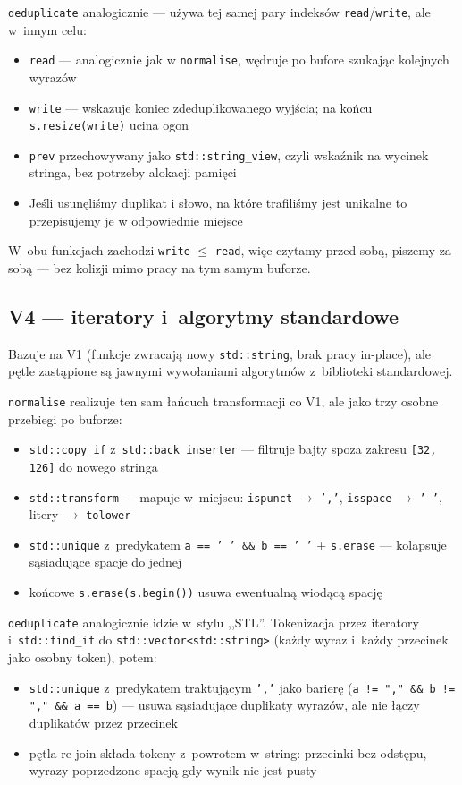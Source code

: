 \documentclass[11pt,a4paper]{article}
\begin{document}
\texttt{deduplicate} analogicznie --- używa tej samej pary indeksów \texttt{read}/\texttt{write}, ale w~innym celu:
\begin{itemize}
    \item \texttt{read} --- analogicznie jak w \texttt{normalise}, wędruje po bufore szukając kolejnych wyrazów
    \item \texttt{write} --- wskazuje koniec zdeduplikowanego wyjścia; na końcu \texttt{s.resize(write)} ucina ogon
    \item \texttt{prev} przechowywany jako \texttt{std::string\_view}, czyli wskaźnik na wycinek stringa, bez potrzeby alokacji pamięci
    \item Jeśli usunęliśmy duplikat i słowo, na które trafiliśmy jest unikalne to przepisujemy je w odpowiednie miejsce
\end{itemize}

W~obu funkcjach zachodzi \texttt{write} $\leq$ \texttt{read}, więc czytamy przed sobą, piszemy za sobą --- bez kolizji mimo pracy na tym samym buforze.

\subsection{V4 --- iteratory i~algorytmy standardowe}
Bazuje na V1 (funkcje zwracają nowy \texttt{std::string}, brak pracy in-place), ale pętle zastąpione są jawnymi wywołaniami algorytmów z~biblioteki standardowej.

\texttt{normalise} realizuje ten sam łańcuch transformacji co V1, ale jako trzy osobne przebiegi po buforze:
\begin{itemize}
    \item \texttt{std::copy\_if} z~\texttt{std::back\_inserter} --- filtruje bajty spoza zakresu \texttt{[32, 126]} do nowego stringa
    \item \texttt{std::transform} --- mapuje w~miejscu: \texttt{ispunct} $\to$ \texttt{','}, \texttt{isspace} $\to$ \texttt{' '}, litery $\to$ \texttt{tolower}
    \item \texttt{std::unique} z~predykatem \texttt{a == ' ' \&\& b == ' '} + \texttt{s.erase} --- kolapsuje sąsiadujące spacje do jednej
    \item końcowe \texttt{s.erase(s.begin())} usuwa ewentualną wiodącą spację
\end{itemize}

\texttt{deduplicate} analogicznie idzie w~stylu ,,STL''. Tokenizacja przez iteratory i~\texttt{std::find\_if} do \texttt{std::vector<std::string>} (każdy wyraz i~każdy przecinek jako osobny token), potem:
\begin{itemize}
    \item \texttt{std::unique} z~predykatem traktującym \texttt{','} jako barierę (\texttt{a != "," \&\& b != "," \&\& a == b}) --- usuwa sąsiadujące duplikaty wyrazów, ale nie łączy duplikatów przez przecinek
    \item pętla re-join składa tokeny z~powrotem w~string: przecinki bez odstępu, wyrazy poprzedzone spacją gdy wynik nie jest pusty
\end{itemize}
\end{document}
